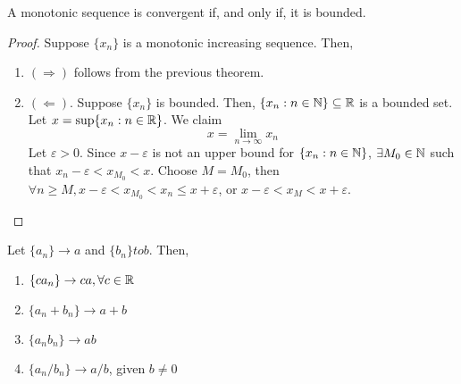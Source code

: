 \begin{theorem}
    A monotonic sequence is convergent if, and only if, it is bounded.
\end{theorem}

\begin{proof}
    Suppose $\{ x_n\}$ is a monotonic increasing sequence. Then,
    \begin{enumerate}
        \item $( \Rightarrow )$ follows from the previous theorem.
        \item $( \Leftarrow )$. Suppose $ \{x_n \} $ is bounded. Then, $ \{ x_n: n \in \mathbb{N}\} \subseteq \mathbb{R}$ is a bounded set. Let $x = \sup \{ x_n: n \in \mathbb{R}\}$. We claim 
        \begin{equation*}
            x = \lim \limits_{n\to \infty} x_n
        \end{equation*}
        Let $\varepsilon > 0$. Since $x - \varepsilon$ is not an upper bound for $\{ x_n: n \in \mathbb{N}\}$, $\exists M_0 \in \mathbb{N}$ such that $x_n - \varepsilon < x_{M_0} < x$. Choose $M = M_0$, then $\forall n \geq M, x-\varepsilon < x_{M_0} < x_n \leq x + \varepsilon$, or $x-\varepsilon < x_M < x+\varepsilon$.
    \end{enumerate}
\end{proof}

\begin{theorem}
    Let $\{ a_n\} \to a$ and $\{ b_n\} to b$. Then,
    \begin{enumerate}
        \item $\{ ca_n\} \to ca, \forall c \in \mathbb{R}$
        \item $\{ a_n + b_n\} \to a + b$
        \item $\{ a_nb_n\} \to ab $
        \item $\{a_n/b_n\} \to a/b$, given $b \ne 0$
    \end{enumerate}
\end{theorem}

